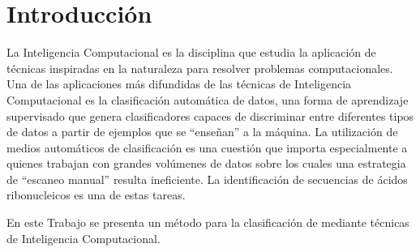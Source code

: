 %
%
%
\chapter{Introducción}
\setcounter{page}{1}
%
La Inteligencia Computacional es la disciplina que estudia la
aplicación de técnicas inspiradas en la naturaleza para resolver
problemas computacionales.
Una de las aplicaciones más difundidas de las técnicas de Inteligencia
Computacional es la clasificación automática de datos, una forma de
aprendizaje supervisado que genera clasificadores capaces de
discriminar entre diferentes tipos de datos a partir de ejemplos que
se ``enseñan'' a la máquina.
La utilización de medios automáticos de clasificación es una cuestión
que importa especialmente a quienes trabajan con grandes volúmenes de
datos sobre los cuales una estrategia de ``escaneo manual'' resulta
ineficiente.
La identificación de secuencias de ácidos ribonucleicos es una de
estas tareas.

En este Trabajo se presenta un método para la clasificación de
 mediante técnicas de Inteligencia Computacional.

